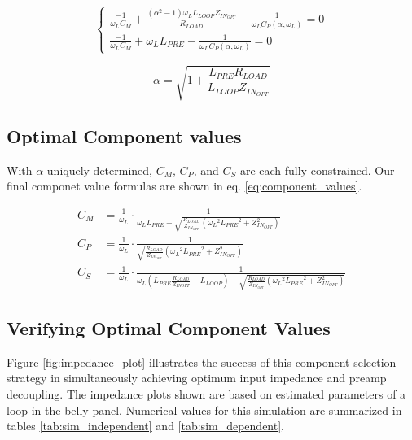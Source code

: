 \begin{equation}\label{eq:syseq}
\begin{cases}
    \frac{-1}{\omega_L C_M} + \frac{(\alpha^2-1) \omega_L L_{LOOP} Z_{IN_{OPT}}}{R_{LOAD}} - \frac{1}{\omega_L
    C_P(\alpha,\omega_L)} = 0\\

    \frac{-1}{\omega_L C_M} + \omega_L L_{PRE} - \frac{1}{\omega_L C_P(\alpha, \omega_L)} = 0 

\end{cases}
\end{equation}

\begin{equation}\label{eq:alpha}
    \alpha = \sqrt{1 + \frac{L_{PRE} R_{LOAD}}{L_{LOOP} Z_{IN_{OPT}}}}
\end{equation}

\subsection{Optimal Component values}
With $\alpha$ uniquely determined, $C_M$, $C_P$, and $C_S$ are each fully constrained. Our final componet value formulas
are shown in eq. \ref{eq:component_values}.


\begin{equation}\label{eq:component_values}
\begin{aligned}
        C_M &= \frac{1}{\omega_L} \cdot \frac{1}{\omega_L L_{PRE} - \sqrt{\frac{R_{LOAD}}{Z_{IN_{OPT}}} ({\omega_L}^2 {L_{PRE}}^2 + Z_{IN_{OPT}}^2)}}\\
        C_P &= \frac{1}{\omega_L} \cdot \frac{1}{\sqrt{\frac{R_{LOAD}}{Z_{IN_{OPT}}} ({\omega_L}^2 {L_{PRE}}^2 + Z_{IN_{OPT}}^2)}}\\
        C_S &= \frac{1}{\omega_L} \cdot \frac{1}{\omega_L(L_{PRE} \frac{R_{LOAD}}{Z_{IN{OPT}}} + L_{LOOP}) - \sqrt{\frac{R_{LOAD}}{Z_{IN_{OPT}}} ({\omega_L}^2 {L_{PRE}}^2 + Z_{IN_{OPT}}^2)}}
\end{aligned}
\end{equation}

\subsection{Verifying Optimal Component Values}
Figure \ref{fig:impedance_plot} illustrates the success of this component selection strategy in simultaneously achieving
optimum input impedance and preamp decoupling. The impedance plots shown are based on estimated parameters of a loop in
the belly panel. Numerical values for this simulation are summarized in tables \ref{tab:sim_independent} and
\ref{tab:sim_dependent}.

